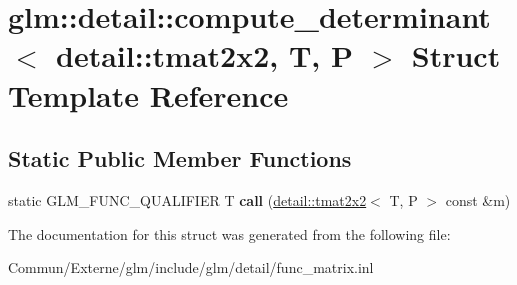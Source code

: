 \hypertarget{structglm_1_1detail_1_1compute__determinant_3_01detail_1_1tmat2x2_00_01_t_00_01_p_01_4}{}\section{glm\+:\+:detail\+:\+:compute\+\_\+determinant$<$ detail\+:\+:tmat2x2, T, P $>$ Struct Template Reference}
\label{structglm_1_1detail_1_1compute__determinant_3_01detail_1_1tmat2x2_00_01_t_00_01_p_01_4}
\subsection*{Static Public Member Functions}
\begin{DoxyCompactItemize}
\item 
static G\+L\+M\+\_\+\+F\+U\+N\+C\+\_\+\+Q\+U\+A\+L\+I\+F\+I\+ER T {\bfseries call} (\hyperlink{structglm_1_1detail_1_1tmat2x2}{detail\+::tmat2x2}$<$ T, P $>$ const \&m)\hypertarget{structglm_1_1detail_1_1compute__determinant_3_01detail_1_1tmat2x2_00_01_t_00_01_p_01_4_a58a62a3968a9af7acd4522972236742e}{}\label{structglm_1_1detail_1_1compute__determinant_3_01detail_1_1tmat2x2_00_01_t_00_01_p_01_4_a58a62a3968a9af7acd4522972236742e}

\end{DoxyCompactItemize}


The documentation for this struct was generated from the following file\+:\begin{DoxyCompactItemize}
\item 
Commun/\+Externe/glm/include/glm/detail/func\+\_\+matrix.\+inl\end{DoxyCompactItemize}
